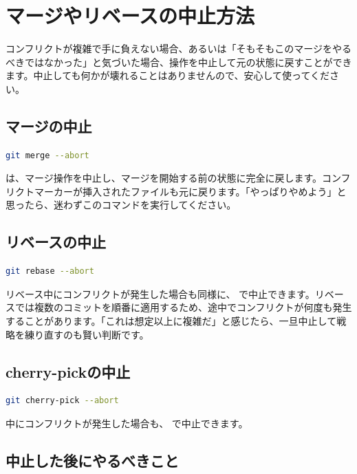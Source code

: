 \section{マージやリベースの中止方法}

コンフリクトが複雑で手に負えない場合、あるいは「そもそもこのマージをやるべきではなかった」と気づいた場合、操作を中止して元の状態に戻すことができます。中止しても何かが壊れることはありませんので、安心して使ってください。

\subsection{マージの中止}

\begin{lstlisting}[language=bash]
git merge --abort
\end{lstlisting}

 は、マージ操作を中止し、マージを開始する前の状態に完全に戻します。コンフリクトマーカーが挿入されたファイルも元に戻ります。「やっぱりやめよう」と思ったら、迷わずこのコマンドを実行してください。

\subsection{リベースの中止}

\begin{lstlisting}[language=bash]
git rebase --abort
\end{lstlisting}

リベース中にコンフリクトが発生した場合も同様に、 で中止できます。リベースでは複数のコミットを順番に適用するため、途中でコンフリクトが何度も発生することがあります。「これは想定以上に複雑だ」と感じたら、一旦中止して戦略を練り直すのも賢い判断です。

\subsection{cherry-pickの中止}

\begin{lstlisting}[language=bash]
git cherry-pick --abort
\end{lstlisting}

 中にコンフリクトが発生した場合も、 で中止できます。

\subsection{中止した後にやるべきこと}

